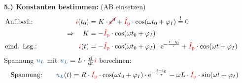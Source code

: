 {\begin{frame}
        \textbf{5.) Konstanten bestimmen:} (AB einsetzen)%
        \begin{align*}
            &\text{Anf.bed.:}&&&
                \eci{i}(t_0) &= K \cdot \redcancel{\mathrm{e}^0} + \eci{\hat{I}_{\mathrm p}} \cdot \cos(\omega t_0 + \varphi_I) \overset{!}{=} 0 \\
            &&&&
                \Rightarrow\quad K &= -\eci{\hat{I}_{\mathrm p}} \cdot \cos(\omega t_0 + \varphi_I) \\
            &\text{eind. Lsg.:}&&&
                \eci{i}(t) &= -\eci{\hat{I}_{\mathrm p}} \cdot \cos(\omega t_0 + \varphi_I) \cdot \mathrm{e}^{-\frac{t-t_0}{\tau}} + \eci{\hat{I}_{\mathrm p}} \cdot \cos(\omega t + \varphi_I)
            \\[-15pt]&\hphantom{R1oooooooooo}&&&\hphantom{L3oooooo}&\hphantom{R3oooooooooooooooooooooooooooooooooooooooooooooo}\nonumber%
        \end{align*}
        Spannung $\ecv{u_L}$ mit $\ecv{u_L} = L \cdot \dt \eci{i}$ berechnen:
        \begin{align*}
            &\text{Spannung:}&&&
                \ecv{u_L}(t) &= R \cdot \eci{\hat{I}_{\mathrm p}} \cdot \cos(\omega t_0 + \varphi_I) \cdot \mathrm{e}^{-\frac{t-t_0}{\tau}} - \omega L \cdot \eci{\hat{I}_{\mathrm p}} \cdot \sin(\omega t + \varphi_I)
        \end{align*}
    \end{frame}

}%

